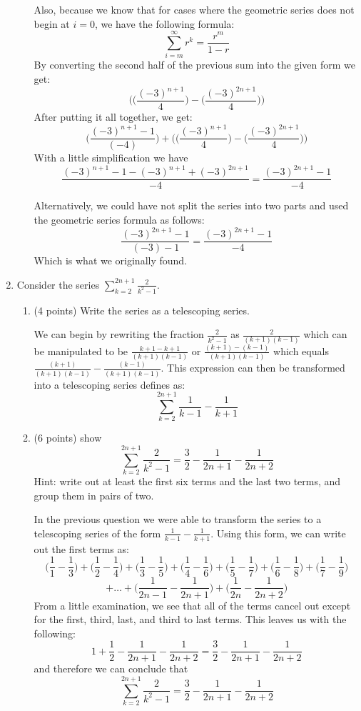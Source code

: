 \documentclass[11pt]{article}
\begin{document}
\begin{enumerate}
\begin{enumerate}
Also, because we know that for cases where the geometric series does not begin at $i = 0$, we have the following formula:
$$ \sum_{i = m}^{\infty} r^k = \frac{r^m}{1-r} $$
By converting the second half of the previous sum into the given form we get:
$$ \Bigg( \bigg( \frac{(-3)^{n+1}}{4} \bigg) - \bigg( \frac{(-3)^{2n+1}}{4} \bigg) \Bigg) $$
After putting it all together, we get:
$$ \Bigg( \frac{(-3)^{n+1} - 1}{(-4)} \Bigg) + \Bigg( \bigg( \frac{(-3)^{n+1}}{4} \bigg) - \bigg( \frac{(-3)^{2n+1}}{4} \bigg) \Bigg) $$
With a little simplification we have
$$ \frac{(-3)^{n+1} - 1 - (-3)^{n+1} + (-3)^{2n+1}}{-4} = \frac{(-3)^{2n+1} - 1}{-4} $$

Alternatively, we could have not split the series into two parts and used the geometric series formula as follows:
$$ \frac{(-3)^{2n+1} - 1}{(-3) - 1} = \frac{(-3)^{2n+1} - 1}{-4} $$
Which is what we originally found.  

\end{enumerate}

\newpage

\item Consider the series $\sum_{k=2}^{2n+1}\frac{2}{k^2-1}.$
\begin{enumerate}
\item (4 points) Write the series as a telescoping series.

We can begin by rewriting the fraction $\frac{2}{k^2-1}$ as $\frac{2}{(k+1)(k-1)}$ which can be manipulated to be $\frac{k+1-k+1}{(k+1)(k-1)}$ or $\frac{(k+1)-(k-1)}{(k+1)(k-1)}$ which equals $\frac{(k+1)}{(k+1)(k-1)} - \frac{(k-1)}{(k+1)(k-1)}$.  This expression can then be transformed into a telescoping series defines as:
$$ \sum_{k=2}^{2n+1} \frac{1}{k-1} - \frac{1}{k+1} $$

\item (6 points) show 
$$\sum_{k=2}^{2n+1}\frac{2}{k^2-1}= \frac{3}{2}-\frac{1}{2n+1}-\frac{1}{2n+2}$$
Hint: write out at least the first six terms and the last two terms, and group them in pairs of two.

In the previous question we were able to transform the series to a telescoping series of the form $\frac{1}{k-1} - \frac{1}{k+1}$.  Using this form, we can write out the first terms as:
$$ \bigg(\frac{1}{1} - \frac{1}{3}\bigg) + \bigg(\frac{1}{2} - \frac{1}{4}\bigg) + \bigg(\frac{1}{3} - \frac{1}{5}\bigg) + \bigg(\frac{1}{4} - \frac{1}{6}\bigg) + \bigg(\frac{1}{5} - \frac{1}{7}\bigg) + \bigg(\frac{1}{6} - \frac{1}{8}\bigg) + \bigg(\frac{1}{7} - \frac{1}{9}\bigg)$$
$$ + \dots + \bigg(\frac{1}{2n-1} - \frac{1}{2n+1}\bigg) + \bigg(\frac{1}{2n} - \frac{1}{2n+2}\bigg)$$
From a little examination, we see that all of the terms cancel out except for the first, third, last, and third to last terms.  This leaves us with the following:
$$ 1 + \frac{1}{2} - \frac{1}{2n+1} - \frac{1}{2n+2} = \frac{3}{2} - \frac{1}{2n+1} - \frac{1}{2n+2} $$
and therefore we can conclude that 
$$\sum_{k=2}^{2n+1}\frac{2}{k^2-1}= \frac{3}{2}-\frac{1}{2n+1}-\frac{1}{2n+2}$$


\end{enumerate}
\end{enumerate}
\end{document}
